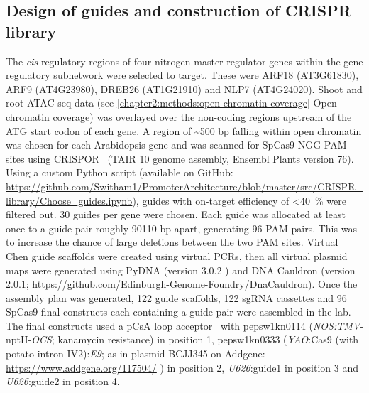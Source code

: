 \documentclass[../main.tex]{subfiles}
\begin{document}
\subsection{Design of guides and construction of CRISPR library}\label{chapter2:methods:design-of-guides}
The \textit{cis}\hyp{}regulatory regions of four nitrogen master regulator genes within the gene regulatory subnetwork were selected to target.
These were ARF18 (AT3G61830), ARF9 (AT4G23980), DREB26 (AT1G21910) and NLP7 (AT4G24020).
Shoot and root ATAC-seq data \autocite{potterCytokininModulatesContextdependent2018} (see \autoref{chapter2:methods:open-chromatin-coverage} Open chromatin coverage) was overlayed over the non-coding regions upstream of the ATG start codon of each gene.
A region of \textasciitilde{}500 bp falling within open chromatin was chosen for each Arabidopsis gene and was scanned for SpCas9 NGG PAM sites using CRISPOR~\autocite{concordetCRISPORIntuitiveGuide2018} (TAIR 10 \autocite{lameschArabidopsisInformationResource2012} genome assembly, Ensembl Plants \autocite{howeEnsemblGenomes20202020} version 76).
Using a custom Python \autocite{pythoncoreteamPythonDynamicOpen2020} script (available on GitHub: \url{https://github.com/Switham1/PromoterArchitecture/blob/master/src/CRISPR_library/Choose_guides.ipynb}), guides with on\hyp{}target efficiency \autocite{doenchOptimizedSgRNADesign2016} of \textless{}\SI{40}{\percent} were filtered out.
30 guides per gene were chosen.
Each guide was allocated at least once to a guide pair roughly 90\textendash{}110 bp apart, generating 96 PAM pairs.
This was to increase the chance of large deletions between the two PAM sites.
Virtual Chen \autocite{chenDynamicImagingGenomic2013} guide scaffolds were created using virtual PCRs, then all virtual plasmid maps were generated using PyDNA (version 3.0.2 \autocite{pereiraPydnaSimulationDocumentation2015}) and DNA Cauldron (version 2.0.1; \url{https://github.com/Edinburgh-Genome-Foundry/DnaCauldron}).
Once the assembly plan was generated, 122 guide scaffolds, 122 sgRNA cassettes and 96 SpCas9 final constructs each containing a guide pair were assembled in the lab.
The final constructs used a pCsA loop acceptor~\autocite{pollakLoopAssemblySimple2018} with pepsw1kn0114 (\textit{NOS:TMV}-nptII-\textit{OCS}; kanamycin resistance) in position 1, pepsw1kn0333 (\textit{YAO}:Cas9 (with potato intron IV2):\textit{E9}; as in plasmid BCJJ345 on Addgene: \url{https://www.addgene.org/117504/} \autocite{castelOptimizationTDNAArchitecture2019}) in position 2, \textit{U626}:guide1 in position 3 and \textit{U626}:guide2 in position 4.
\end{document}
